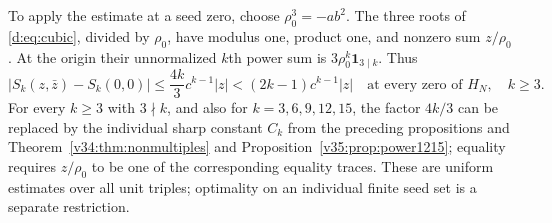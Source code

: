 \documentclass[UTF8,11pt]{ctexart}
\theoremstyle{definition}
\numberwithin{equation}{section}
\begin{document}
To apply the estimate at a seed zero, choose $\rho_0^3=-ab^2$.
The three roots of \eqref{d:eq:cubic}, divided by $\rho_0$, have
modulus one, product one, and nonzero sum $z/\rho_0$. At the origin
their unnormalized $k$th power sum is
$3\rho_0^k\mathbf1_{3\mid k}$. Thus
\begin{equation}\label{d:eq:scaledpower}
 |S_k(z,\bar z)-S_k(0,0)|
 \le\frac{4k}{3}c^{k-1}|z|<(2k-1)c^{k-1}|z|
 \quad\text{at every zero of }H_N,\quad k\ge3.
\end{equation}
For every $k\ge3$ with $3\nmid k$, and also for $k=3,6,9,12,15$,
the factor $4k/3$ can be replaced by the individual sharp constant
$C_k$ from the preceding propositions and
Theorem~\ref{v34:thm:nonmultiples} and
Proposition~\ref{v35:prop:power1215}; equality requires
$z/\rho_0$ to be one of the corresponding equality traces.
These are uniform estimates over all unit triples; optimality
on an individual finite seed set is a separate restriction.
\end{document}
